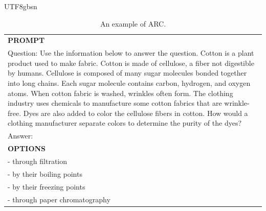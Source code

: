 \documentclass[11pt, a4paper, logo, copyright, nonumbering]{deepseek}
\begin{document}
\begin{CJK*}{UTF8}{gbsn}
\begin{table}[h]
    \centering \small
\begin{tabular}{p{12cm}}
\toprule
\textbf{PROMPT}\\
Question: Use the information below to answer the question. Cotton is a plant product used to make fabric. Cotton is made of cellulose, a fiber not digestible by humans. Cellulose is composed of many sugar molecules bonded together into long chains. Each sugar molecule contains carbon, hydrogen, and oxygen atoms. When cotton fabric is washed, wrinkles often form. The clothing industry uses chemicals to manufacture some cotton fabrics that are wrinkle-free. Dyes are also added to color the cellulose fibers in cotton. How would a clothing manufacturer separate colors to determine the purity of the dyes? \\
Answer: \\
\midrule
\textbf{OPTIONS}\\
- through filtration\\
- by their boiling points\\
- by their freezing points\\
- through paper chromatography\\
\bottomrule
\end{tabular}
    \caption{\centering An example of ARC.}
    \label{tab:arc_eval_format_example}
\end{table}


\end{CJK*}
\end{document}
